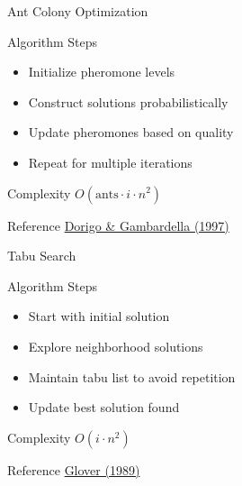 \documentclass[aspectratio=169]{beamer}
\begin{document}
\begin{frame}{Ant Colony Optimization}

\begin{block}{Algorithm Steps}
\begin{itemize}
\item Initialize pheromone levels
\item Construct solutions probabilistically
\item Update pheromones based on quality
\item Repeat for multiple iterations
\end{itemize}
\end{block}

\begin{exampleblock}{Complexity}
$O(\text{ants} \cdot i \cdot n^2)$
\end{exampleblock}

\begin{alertblock}{Reference}
\href{https://ieeexplore.ieee.org/document/585892}{Dorigo \& Gambardella (1997)}
\end{alertblock}

\end{frame}

\begin{frame}{Tabu Search}

\begin{block}{Algorithm Steps}
\begin{itemize}
\item Start with initial solution
\item Explore neighborhood solutions
\item Maintain tabu list to avoid repetition
\item Update best solution found
\end{itemize}
\end{block}

\begin{exampleblock}{Complexity}
$O(i \cdot n^2)$
\end{exampleblock}

\begin{alertblock}{Reference}
\href{https://pubsonline.informs.org/doi/pdf/10.1287/ijoc.1.3.190}{Glover (1989)}
\end{alertblock}

\end{frame}
\end{document}
